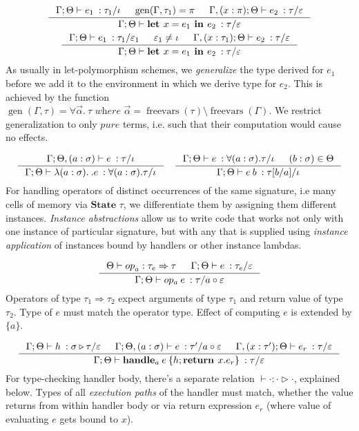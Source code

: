 \documentclass[declaration,shortabstract]{iithesis}
\theoremstyle{definition} \newtheorem{definition}{Definition}[section]
\newcommand{\types}[4][\Gamma;\Theta]{\ensuremath{{{#1} \vdash {#2} \: : {#3}/{#4}}}}
\newcommand{\lam}[1][x]{\ensuremath{\lambda #1.\:}}
\newcommand{\optypes}[5][\Theta]{\ensuremath{{#1}\vdash{#2}_{#3} : {#4} \Rightarrow {#5}}}
\newcommand{\ops}[2]{\optypes{op}{a}{#1}{#2}}
\begin{document}
\begin{gather*}
\begin{gathered}
\inference{
    \types{e_1}{\tau_1}{\iota} &
    \operatorname{gen}(\Gamma, \tau_1) = \pi &
    \types[\Gamma,(x:\pi);\Theta]{e_2}{\tau}{\varepsilon}
}{
    \types{\textbf{let } x = e_1 \textbf{ in } e_2}{\tau}{\varepsilon}
}
\\
\inference{
    \types{e_1}{\tau_1}{\varepsilon_1} & 
    \varepsilon_1 \neq \iota & 
    \types[\Gamma,(x:\tau_1);\Theta]{e_2}{\tau}{\varepsilon}
}{
    \types{\textbf{let } x = e_1 \textbf{ in } e_2}{\tau}{\varepsilon}
}
\end{gathered}
\end{gather*}
As usually in let-polymorphism schemes, we \textit{generalize} the type derived for $e_1$ before
we add it to the environment in which we derive type for $e_2$.
This is achieved by the function
$\operatorname{gen}(\Gamma, \tau) = \forall \vec\alpha.\:\tau \textit{ where }
\vec\alpha = \operatorname{freevars}(\tau) \setminus \operatorname{freevars}(\Gamma)$.
We restrict generalization to only $pure$ terms,
i.e. such that their computation would cause no effects.

$$
\inference{
    \types[\Gamma; \Theta, (a : \sigma)]{e}{\tau}{\iota}
}{
    \types{\lam[(a : \sigma)]. e}{\forall (a : \sigma) . \tau}{\iota}
}
\quad
\inference{
    \types{e}{\forall (a : \sigma) . \tau}{\iota} & (b:\sigma) \in \Theta
}{
    \types{e\:b}{\tau[b/a]}{\iota}
}
$$
For handling operators of distinct occurrences of the same signature,
i.e many cells of memory via $\textbf{State }\tau$,
we differentiate them by assigning them different instances.
\textit{Instance abstractions} allow us to write code that works not only with one instance of particular signature,
but with any that is supplied using \textit{instance application} of instances bound by handlers or other instance lambdas.

$$
\inference{
    \ops{\tau_e}{\tau} &
    \types{e}{\tau_e}{\varepsilon} 
}{
    \types{op_a \: e}{\tau}{a \circ \varepsilon}
}
$$
Operators of type $\tau_1 \Rightarrow \tau_2$ expect arguments of type $\tau_1$
and return value of type $\tau_2$. Type of $e$ must match the operator type.
Effect of computing $e$ is extended by $\{a\}$.

$$
 \inference{
    \types{h}{\sigma \triangleright \tau}{\varepsilon} &
    \types[\Gamma;\Theta,(a:\sigma)]{e}{\tau'}{a \circ \varepsilon} &
    \types[\Gamma,(x:\tau');\Theta]{e_r}{\tau}{\varepsilon}
}{
    \types{\textbf{handle}_a \: e\: \{h;\textbf{return } x. e_r\}}{\tau}{\varepsilon}
}
$$
For type-checking handler body, there's a separate relation $\vdash \cdot : \cdot \triangleright \cdot$, explained below.
Types of all \textit{exectution paths} of the handler must match,
whether the value returns from within handler body
or via return expression $e_r$ (where value of evaluating $e$ gets bound to $x$).
\end{document}
